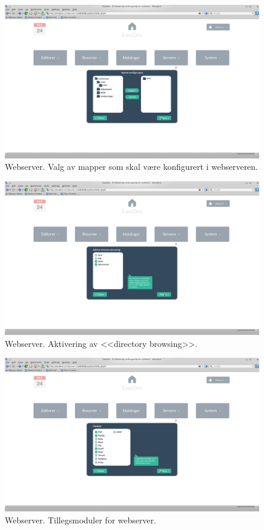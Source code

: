 \begin{figure}[ht]
\includegraphics[width=\textwidth,height=\textheight,keepaspectratio]{./img/prosessdokumentasjon/hifi/a2.png}
\caption[Hi-fi Webserver 2]{Webserver. Valg av mapper som skal være konfigurert i webserveren.}
\label{fig:apachehi2}
\end{figure}

\begin{figure}[ht]
\includegraphics[width=\textwidth,height=\textheight,keepaspectratio]{./img/prosessdokumentasjon/hifi/a3.png}
\caption[Hi-fi Webserver 3]{Webserver. Aktivering av <<directory browsing>>.}
\label{fig:apachehi3}
\end{figure}

\begin{figure}[ht]
\includegraphics[width=\textwidth,height=\textheight,keepaspectratio]{./img/prosessdokumentasjon/hifi/a4.png}
\caption[Hi-fi Webserver 4]{Webserver. Tillegsmoduler for webserver.}
\label{fig:apachehi4}
\end{figure}

